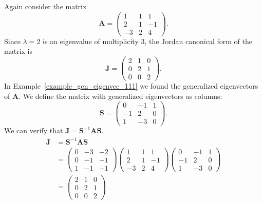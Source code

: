 \begin{Example}
  \label{example_jordan_111}
  Again consider the matrix
  \[
  \mathbf{A} = 
  \begin{pmatrix}
    1 & 1 & 1 \\
    2 & 1 & -1 \\
    -3 & 2 & 4 
  \end{pmatrix}.
  \]
  Since $\lambda = 2$ is an eigenvalue of multiplicity 3, the Jordan canonical
  form of the matrix is
  \[
  \mathbf{J} = 
  \begin{pmatrix}
    2 & 1 & 0 \\
    0 & 2 & 1 \\
    0 & 0 & 2 
  \end{pmatrix}.
  \]
  In Example~\ref{example_gen_eigenvec_111} we found the generalized 
  eigenvectors of
  $\mathbf{A}$.  We define the matrix with generalized eigenvectors as columns:
  \[
  \mathbf{S} = 
  \begin{pmatrix}
    0 & -1 & 1 \\
    -1 & 2 & 0 \\
    1 & -3 & 0 
  \end{pmatrix}.
  \]
  We can verify that $\mathbf{J} = \mathbf{S}^{-1} \mathbf{A} \mathbf{S}$.
  \begin{align*}
    \mathbf{J}    &= \mathbf{S}^{-1} \mathbf{A} \mathbf{S} \\
    &=      \begin{pmatrix}
      0 & -3 & -2 \\
      0 & -1 & -1 \\
      1 & -1 & -1 
    \end{pmatrix}
    \begin{pmatrix}
      1 & 1 & 1 \\
      2 & 1 & -1 \\
      -3 & 2 & 4 
    \end{pmatrix}
    \begin{pmatrix}
      0 & -1 & 1 \\
      -1 & 2 & 0 \\
      1 & -3 & 0 
    \end{pmatrix} \\
    &=      \begin{pmatrix}
      2 & 1 & 0 \\
      0 & 2 & 1 \\
      0 & 0 & 2 
    \end{pmatrix}
  \end{align*}
\end{Example}





